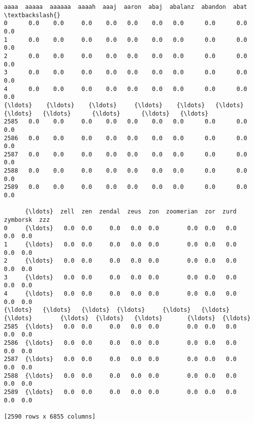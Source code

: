 \documentclass[11pt]{article}
\makeatletter
\newcommand{\boxspacing}{\kern\kvtcb@left@rule\kern\kvtcb@boxsep}
\newcommand{\prompt}[4]{
        {\ttfamily\llap{{\color{#2}[#3]:\hspace{3pt}#4}}\vspace{-\baselineskip}}
    }
\makeatother
\begin{document}
            \begin{tcolorbox}[breakable, size=fbox, boxrule=.5pt, pad at break*=1mm, opacityfill=0]
\prompt{Out}{outcolor}{201}{\boxspacing}
\begin{Verbatim}[commandchars=\\\{\}]
      aaaa  aaaaa  aaaaaa  aaaah  aaaj  aaron  abaj  abalanz  abandon  abat  \textbackslash{}
0      0.0    0.0     0.0    0.0   0.0    0.0   0.0      0.0      0.0   0.0
1      0.0    0.0     0.0    0.0   0.0    0.0   0.0      0.0      0.0   0.0
2      0.0    0.0     0.0    0.0   0.0    0.0   0.0      0.0      0.0   0.0
3      0.0    0.0     0.0    0.0   0.0    0.0   0.0      0.0      0.0   0.0
4      0.0    0.0     0.0    0.0   0.0    0.0   0.0      0.0      0.0   0.0
{\ldots}    {\ldots}    {\ldots}     {\ldots}    {\ldots}   {\ldots}    {\ldots}   {\ldots}      {\ldots}      {\ldots}   {\ldots}
2585   0.0    0.0     0.0    0.0   0.0    0.0   0.0      0.0      0.0   0.0
2586   0.0    0.0     0.0    0.0   0.0    0.0   0.0      0.0      0.0   0.0
2587   0.0    0.0     0.0    0.0   0.0    0.0   0.0      0.0      0.0   0.0
2588   0.0    0.0     0.0    0.0   0.0    0.0   0.0      0.0      0.0   0.0
2589   0.0    0.0     0.0    0.0   0.0    0.0   0.0      0.0      0.0   0.0

      {\ldots}  zell  zen  zendal  zeus  zon  zoomerian  zor  zurd  zymborsk  zzz
0     {\ldots}   0.0  0.0     0.0   0.0  0.0        0.0  0.0   0.0       0.0  0.0
1     {\ldots}   0.0  0.0     0.0   0.0  0.0        0.0  0.0   0.0       0.0  0.0
2     {\ldots}   0.0  0.0     0.0   0.0  0.0        0.0  0.0   0.0       0.0  0.0
3     {\ldots}   0.0  0.0     0.0   0.0  0.0        0.0  0.0   0.0       0.0  0.0
4     {\ldots}   0.0  0.0     0.0   0.0  0.0        0.0  0.0   0.0       0.0  0.0
{\ldots}   {\ldots}   {\ldots}  {\ldots}     {\ldots}   {\ldots}  {\ldots}        {\ldots}  {\ldots}   {\ldots}       {\ldots}  {\ldots}
2585  {\ldots}   0.0  0.0     0.0   0.0  0.0        0.0  0.0   0.0       0.0  0.0
2586  {\ldots}   0.0  0.0     0.0   0.0  0.0        0.0  0.0   0.0       0.0  0.0
2587  {\ldots}   0.0  0.0     0.0   0.0  0.0        0.0  0.0   0.0       0.0  0.0
2588  {\ldots}   0.0  0.0     0.0   0.0  0.0        0.0  0.0   0.0       0.0  0.0
2589  {\ldots}   0.0  0.0     0.0   0.0  0.0        0.0  0.0   0.0       0.0  0.0

[2590 rows x 6855 columns]
\end{Verbatim}
\end{tcolorbox}
        
    \begin{tcolorbox}[breakable, size=fbox, boxrule=1pt, pad at break*=1mm,colback=cellbackground, colframe=cellborder]
\prompt{In}{incolor}{201}{\boxspacing}
\begin{Verbatim}[commandchars=\\\{\}]

\end{Verbatim}
\end{tcolorbox}


    
    
    
\end{document}
